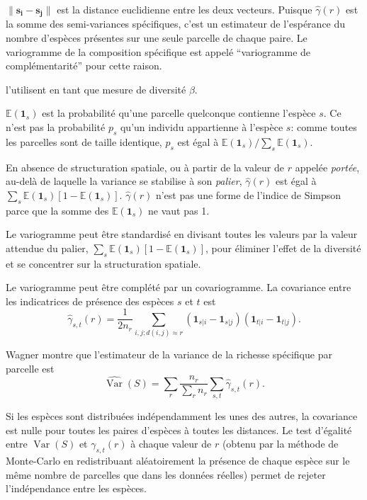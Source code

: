 \documentclass[
  11pt,
  french,
  a4paper,
  extrafontsizes,onecolumn,openright
  ]{memoir}
\begin{document}
\(\|\mathbf{s_i}-\mathbf{s_j}\|\) est la distance euclidienne entre les deux vecteurs.
Puisque \(\hat{\gamma}(r)\) est la somme des semi-variances spécifiques, c'est un estimateur de l'espérance du nombre d'espèces présentes sur une seule parcelle de chaque paire.
Le variogramme de la composition spécifique est appelé \enquote{variogramme de complémentarité} pour cette raison.

\textcite{Bacaro2007a} l'utilisent en tant que mesure de diversité \(\beta\).

\({\mathbb E}({\mathbf 1}_{s})\) est la probabilité qu'une parcelle quelconque contienne l'espèce \(s\).
Ce n'est pas la probabilité \(p_s\) qu'un individu appartienne à l'espèce \(s\):
comme toutes les parcelles sont de taille identique, \(p_s\) est égal à \({{\mathbb E}({\mathbf 1}_{s})}/{\sum_s{{\mathbb E}({\mathbf 1}_{s})}}\).

En absence de structuration spatiale, ou à partir de la valeur de \(r\) appelée \emph{portée}, au-delà de laquelle la variance se stabilise à son \emph{palier}, \(\hat{\gamma}(r)\) est égal à \(\sum_s{{\mathbb E}({\mathbf 1}_{s})[1-{\mathbb E}({\mathbf 1}_{s})]}\).
\(\hat{\gamma}(r)\) n'est pas une forme de l'indice de Simpson parce que la somme des \({\mathbb E}({\mathbf 1}_{s})\) ne vaut pas 1.

Le variogramme peut être standardisé en divisant toutes les valeurs par la valeur attendue du palier, \(\sum_s{{\mathbb E}({\mathbf 1}_{s})[1-{\mathbb E}({\mathbf 1}_{s})]}\), pour éliminer l'effet de la diversité et se concentrer sur la structuration spatiale.

Le variogramme peut être complété par un covariogramme.
La covariance entre les indicatrices de présence des espèces \(s\) et \(t\) est
\begin{equation}
  \label{eq:Estgammast}
  \hat{\gamma}_{s,t}(r) = \frac{1}{2 n_r} \sum_{i,j;d(i,j)\approx r}{({\mathbf 1}_{s|i} - {\mathbf 1}_{s|j})({\mathbf 1}_{t|i} - {\mathbf 1}_{t|j})}.
\end{equation}

Wagner montre que l'estimateur de la variance de la richesse spécifique par parcelle est
\begin{equation}
  \label{eq:VarS}
  \hat{\operatorname{Var}}(S) = \sum_r{\frac{n_r}{\sum_r{n_r}}} \sum_{s,t}{\hat{\gamma}_{s,t}(r)}.
\end{equation}

Si les espèces sont distribuées indépendamment les unes des autres, la covariance est nulle pour toutes les paires d'espèces à toutes les distances.
Le test d'égalité entre \(\operatorname{Var}(S)\) et \(\gamma_{s,t}(r)\) à chaque valeur de \(r\) (obtenu par la méthode de Monte-Carlo en redistribuant aléatoirement la présence de chaque espèce sur le même nombre de parcelles que dans les données réelles) permet de rejeter l'indépendance entre les espèces.
\end{document}
